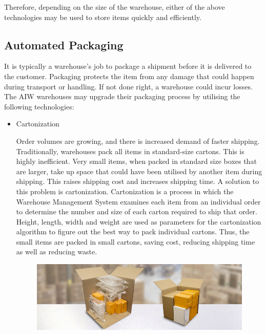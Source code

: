 \documentclass{report}
\begin{document}
Therefore, depending on the size of the warehouse, either of the above technologies may be used to store items quickly and efficiently.

\subsection{Automated Packaging}

It is typically a warehouse's job to package a shipment before it is delivered to the customer. Packaging protects the item from any damage that could happen during transport or handling. If not done right, a warehouse could incur losses. The AIW warehouses may upgrade their packaging process by utilising the following technologies:
\begin{itemize}
\item{Cartonization

Order volumes are growing, and there is increased demand of faster shipping. Traditionally, warehouses pack all items in standard-size cartons. This is highly inefficient. Very small items, when packed in standard size boxes that are larger, take up space that could have been utilised by another item during shipping. This raises shipping cost and increases shipping time. A solution to this problem is cartonization. Cartonization is a process in which the Warehouse Management System examines each item from an individual order to determine the number and size of each carton required to ship that order. Height, length, width and weight are used as parameters for the cartonization algorithm to figure out the best way to pack individual cartons. Thus, the small items are packed in small cartons, saving cost, reducing shipping time as well as reducing waste.}

\begin{figure}[H]
    
    \centering
    \includegraphics[scale=0.4]{carton.jpg}
    \caption{}
    

\end{figure}
\end{itemize}
\end{document}

